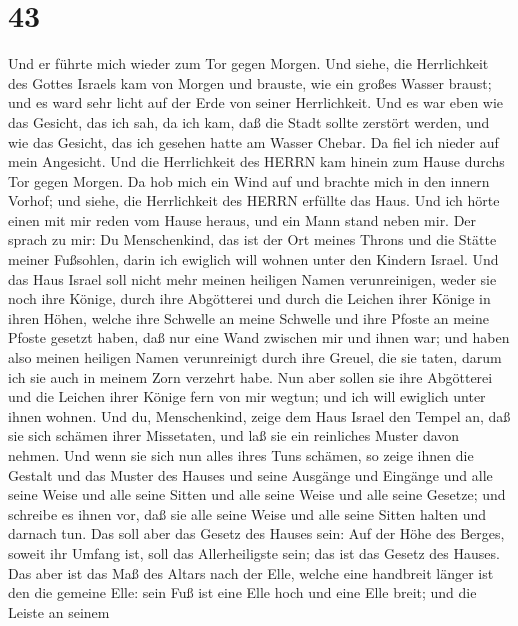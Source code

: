 \hypertarget{section-42}{%
\section{43}\label{section-42}}

 Und er führte mich wieder zum Tor gegen Morgen.
 Und siehe, die Herrlichkeit des Gottes Israels kam von
Morgen und brauste, wie ein großes Wasser braust; und es ward sehr licht
auf der Erde von seiner Herrlichkeit.  Und es war eben wie
das Gesicht, das ich sah, da ich kam, daß die Stadt sollte zerstört
werden, und wie das Gesicht, das ich gesehen hatte am Wasser Chebar. Da
fiel ich nieder auf mein Angesicht.  Und die Herrlichkeit
des HERRN kam hinein zum Hause durchs Tor gegen Morgen.  Da
hob mich ein Wind auf und brachte mich in den innern Vorhof; und siehe,
die Herrlichkeit des HERRN erfüllte das Haus.  Und ich hörte
einen mit mir reden vom Hause heraus, und ein Mann stand neben mir.
 Der sprach zu mir: Du Menschenkind, das ist der Ort meines
Throns und die Stätte meiner Fußsohlen, darin ich ewiglich will wohnen
unter den Kindern Israel. Und das Haus Israel soll nicht mehr meinen
heiligen Namen verunreinigen, weder sie noch ihre Könige, durch ihre
Abgötterei und durch die Leichen ihrer Könige in ihren Höhen,
 welche ihre Schwelle an meine Schwelle und ihre Pfoste an
meine Pfoste gesetzt haben, daß nur eine Wand zwischen mir und ihnen
war; und haben also meinen heiligen Namen verunreinigt durch ihre
Greuel, die sie taten, darum ich sie auch in meinem Zorn verzehrt habe.
 Nun aber sollen sie ihre Abgötterei und die Leichen ihrer
Könige fern von mir wegtun; und ich will ewiglich unter ihnen wohnen.
 Und du, Menschenkind, zeige dem Haus Israel den Tempel an,
daß sie sich schämen ihrer Missetaten, und laß sie ein reinliches Muster
davon nehmen.  Und wenn sie sich nun alles ihres Tuns
schämen, so zeige ihnen die Gestalt und das Muster des Hauses und seine
Ausgänge und Eingänge und alle seine Weise und alle seine Sitten und
alle seine Weise und alle seine Gesetze; und schreibe es ihnen vor, daß
sie alle seine Weise und alle seine Sitten halten und darnach tun.
 Das soll aber das Gesetz des Hauses sein: Auf der Höhe des
Berges, soweit ihr Umfang ist, soll das Allerheiligste sein; das ist das
Gesetz des Hauses.  Das aber ist das Maß des Altars nach
der Elle, welche eine handbreit länger ist den die gemeine Elle: sein
Fuß ist eine Elle hoch und eine Elle breit; und die Leiste an seinem
